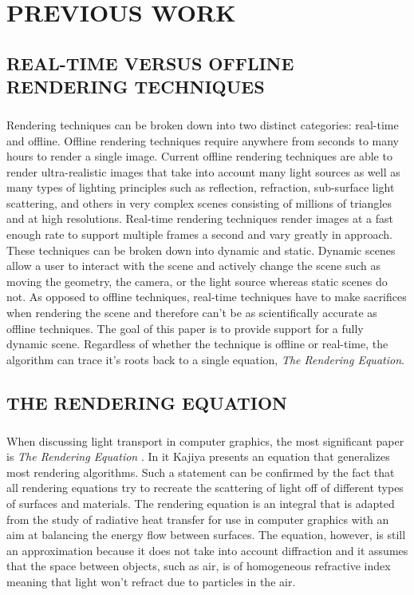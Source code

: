 \chapter{PREVIOUS WORK} \label{sec:prevwork}

\section{REAL-TIME VERSUS OFFLINE RENDERING TECHNIQUES}
\paragraph{}
Rendering techniques can be broken down into two distinct categories: real-time and offline.  Offline rendering techniques require anywhere from seconds to many hours to render a single image.  Current offline rendering techniques are able to render ultra-realistic images that take into account many light sources as well as many types of lighting principles such as reflection, refraction, sub-surface light scattering, and others in very complex scenes consisting of millions of triangles and at high resolutions.  Real-time rendering techniques render images at a fast enough rate to support multiple frames a second and vary greatly in approach.  These techniques can be broken down into dynamic and static.  Dynamic scenes allow a user to interact with the scene and actively change the scene such as moving the geometry, the camera, or the light source whereas static scenes do not.  As opposed to offline techniques, real-time techniques have to make sacrifices when rendering the scene and therefore can't be as scientifically accurate as offline techniques.  The goal of this paper is to provide support for a fully dynamic scene.  Regardless of whether the technique is offline or real-time, the algorithm can trace it's roots back to a single equation, \textit{The Rendering Equation}.

\section{THE RENDERING EQUATION} \label{sec:render}
\paragraph{}
When discussing light transport in computer graphics, the most significant paper is \textit{The Rendering Equation} \cite{Kajiya1986}.  In it Kajiya presents an equation that generalizes most rendering algorithms.  Such a statement can be confirmed by the fact that all rendering equations try to recreate the scattering of light off of different types of surfaces and materials.  The rendering equation is an integral that is adapted from the study of radiative heat transfer for use in computer graphics with an aim at balancing the energy flow between surfaces.  The equation, however, is still an approximation because it does not take into account diffraction and it assumes that the space between objects, such as air, is of homogeneous refractive index meaning that light won't refract due to particles in the air.

